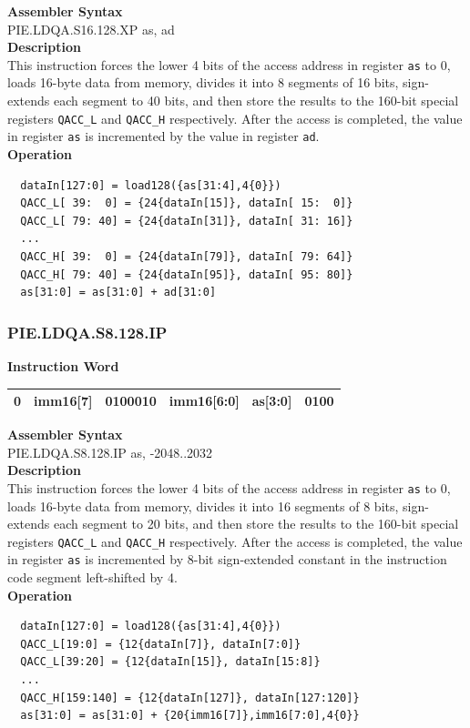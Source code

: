 \textbf{Assembler Syntax} \\
PIE.LDQA.S16.128.XP as, ad \\
\textbf{Description} \\
This instruction forces the lower 4 bits of the access address in register \lstinline{as} to 0, loads 16-byte data from memory, divides it into 8 segments of 16 bits, sign-extends each segment to 40 bits, and then store the results to the 160-bit special registers \lstinline{QACC_L} and \lstinline{QACC_H} respectively. After the access is completed, the value in register \lstinline{as} is incremented by the value in register \lstinline{ad}.\\
\textbf{Operation}
\begin{lstlisting}
  dataIn[127:0] = load128({as[31:4],4{0}})
  QACC_L[ 39:  0] = {24{dataIn[15]}, dataIn[ 15:  0]}
  QACC_L[ 79: 40] = {24{dataIn[31]}, dataIn[ 31: 16]}
  ...
  QACC_H[ 39:  0] = {24{dataIn[79]}, dataIn[ 79: 64]}
  QACC_H[ 79: 40] = {24{dataIn[95]}, dataIn[ 95: 80]}
  as[31:0] = as[31:0] + ad[31:0]
\end{lstlisting}

\newpage
\subsubsection{PIE.LDQA.S8.128.IP}\label{instruction:PIELDQAS8128IP}
\setlength\tabcolsep{6pt}
\textbf{Instruction Word} \\
\begin{tabular}{|c|c|c|c|c|c|}
	\hline
	0 & imm16[7] & 0100010 & imm16[6:0] & as[3:0] & 0100 \\
	\hline
\end{tabular}

\textbf{Assembler Syntax} \\
PIE.LDQA.S8.128.IP as, -2048..2032 \\
\textbf{Description} \\
This instruction forces the lower 4 bits of the access address in register \lstinline{as} to 0, loads 16-byte data from memory, divides it into 16 segments of 8 bits, sign-extends each segment to 20 bits, and then store the results to the 160-bit special registers \lstinline{QACC_L} and \lstinline{QACC_H} respectively. After the access is completed, the value in register \lstinline{as} is incremented by 8-bit sign-extended constant in the instruction code segment left-shifted by 4.\\
\textbf{Operation}
\begin{lstlisting}
  dataIn[127:0] = load128({as[31:4],4{0}})
  QACC_L[19:0] = {12{dataIn[7]}, dataIn[7:0]}
  QACC_L[39:20] = {12{dataIn[15]}, dataIn[15:8]}
  ...
  QACC_H[159:140] = {12{dataIn[127]}, dataIn[127:120]}
  as[31:0] = as[31:0] + {20{imm16[7]},imm16[7:0],4{0}}
\end{lstlisting}


